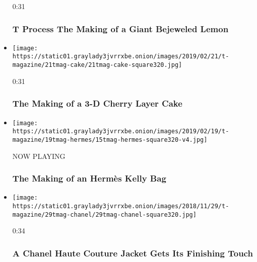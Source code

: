 \begin{itemize}
  0:31

  \hypertarget{t-process--the-making-of-a-giant-bejeweled-lemon}{%
  \subsubsection{T Process \textbar{} The Making of a Giant Bejeweled
  Lemon}\label{t-process--the-making-of-a-giant-bejeweled-lemon}}
\item
  \href{https://www.nytimes3xbfgragh.onion/video/t-magazine/100000006363367/the-making-of-a-3-d-cherry-layer-cake.html?action=click\&module=video-series-bar\&region=header\&pgtype=Article\&playlistId=video/t-process}{}

  \texttt{[image: https://static01.graylady3jvrrxbe.onion/images/2019/02/21/t-magazine/21tmag-cake/21tmag-cake-square320.jpg]}

  0:31

  \hypertarget{the-making-of-a-3-d-cherry-layer-cake}{%
  \subsubsection{The Making of a 3-D Cherry Layer
  Cake}\label{the-making-of-a-3-d-cherry-layer-cake}}
\item
  \texttt{[image: https://static01.graylady3jvrrxbe.onion/images/2019/02/19/t-magazine/19tmag-hermes/15tmag-hermes-square320-v4.jpg]}

  NOW PLAYING

  \hypertarget{the-making-of-an-hermuxe8s-kelly-bag-1}{%
  \subsubsection{The Making of an Hermès Kelly
  Bag}\label{the-making-of-an-hermuxe8s-kelly-bag-1}}
\item
  \href{https://www.nytimes3xbfgragh.onion/video/t-magazine/100000006237069/a-chanel-haute-couture-jacket-gets-its-finishing-touch.html?action=click\&module=video-series-bar\&region=header\&pgtype=Article\&playlistId=video/t-process}{}

  \texttt{[image: https://static01.graylady3jvrrxbe.onion/images/2018/11/29/t-magazine/29tmag-chanel/29tmag-chanel-square320.jpg]}

  0:34

  \hypertarget{a-chanel-haute-couture-jacket-gets-its-finishing-touch}{%
  \subsubsection{A Chanel Haute Couture Jacket Gets Its Finishing
  Touch}\label{a-chanel-haute-couture-jacket-gets-its-finishing-touch}}
\end{itemize}

